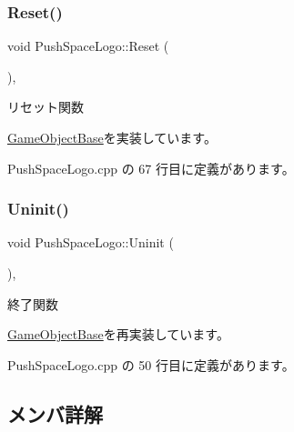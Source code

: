 \subsubsection{\texorpdfstring{Reset()}{Reset()}}
{\footnotesize\ttfamily void Push\+Space\+Logo\+::\+Reset (\begin{DoxyParamCaption}{ }\end{DoxyParamCaption})\hspace{0.3cm}{\ttfamily [override]}, {\ttfamily [virtual]}}



リセット関数 



\mbox{\hyperlink{class_game_object_base_a85c59554f734bcb09f1a1e18d9517dce}{Game\+Object\+Base}}を実装しています。



 Push\+Space\+Logo.\+cpp の 67 行目に定義があります。

\mbox{\label{class_push_space_logo_a06404113db417c58941ca7a13bba161e}} 
\subsubsection{\texorpdfstring{Uninit()}{Uninit()}}
{\footnotesize\ttfamily void Push\+Space\+Logo\+::\+Uninit (\begin{DoxyParamCaption}{ }\end{DoxyParamCaption})\hspace{0.3cm}{\ttfamily [override]}, {\ttfamily [virtual]}}



終了関数 



\mbox{\hyperlink{class_game_object_base_a97e1bc277d7b1c0156d4735de29a022c}{Game\+Object\+Base}}を再実装しています。



 Push\+Space\+Logo.\+cpp の 50 行目に定義があります。



\subsection{メンバ詳解}
\mbox{\label{class_push_space_logo_ab35a4cee269c3ba0b709a8951ccc3d42}} 

